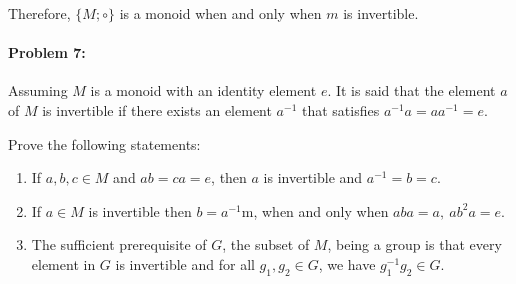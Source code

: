 \documentclass[12pt]{scrartcl}
\begin{document}
{{{\begin{minipage}{36.5em}
Therefore, $\{M; \circ\}$ is a monoid when and only when $m$ is invertible.
\end{minipage}}

\newpage

\paragraph*{Problem 7:} \begin{spacing}{1.2}Assuming $M$ is a monoid with an identity element $e$. It is said that the element $a$ of $M$ is invertible if there exists an element $a^{-1}$ that satisfies $a^{-1} a = a a^{-1} = e.$\\ \end{spacing}

Prove the following statements: 

\begin{enumerate}[label=\arabic*)]

\item If $a,b,c \in M$ and $ab=ca=e$, then $a$ is invertible and $a^{-1} = b= c$. 



\item If $a \in M$ is invertible then $b = a^{-1}$m, when and only when $aba=a, ~ ab^2a=e$.



\item The sufficient prerequisite of $G$, the subset of $M$, being a group is that every element in $G$ is invertible and for all $g_1, g_2 \in G$, we have $g_1^{-1} g_2 \in G$.

\end{enumerate}}}
\end{document}
